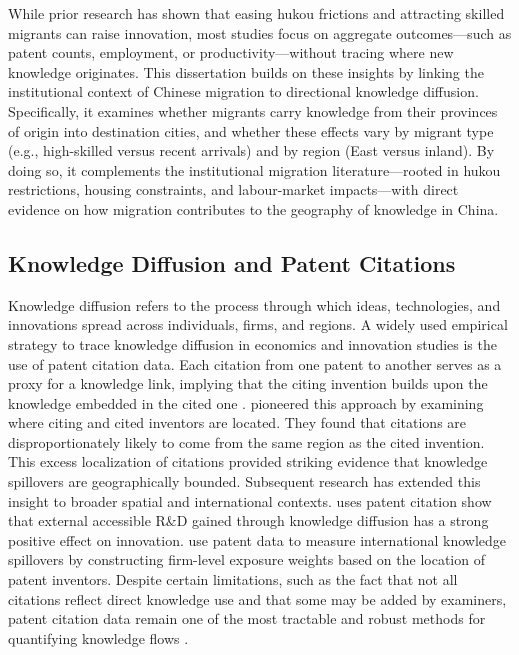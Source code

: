 \documentclass[12pt]{article}
\begin{document}
While prior research has shown that easing hukou frictions and attracting skilled migrants can raise innovation, most studies focus on aggregate outcomes---such as patent counts, employment, or productivity---without tracing where new knowledge originates. This dissertation builds on these insights by linking the institutional context of Chinese migration to directional knowledge diffusion. Specifically, it examines whether migrants carry knowledge from their provinces of origin into destination cities, and whether these effects vary by migrant type (e.g., high-skilled versus recent arrivals) and by region (East versus inland). By doing so, it complements the institutional migration literature---rooted in hukou restrictions, housing constraints, and labour-market impacts---with direct evidence on how migration contributes to the geography of knowledge in China.

\subsection{Knowledge Diffusion and Patent Citations} \label{sec:knowledge_diffusion}
Knowledge diffusion refers to the process through which ideas, technologies, and innovations spread across individuals, firms, and regions. A widely used empirical strategy to trace knowledge diffusion in economics and innovation studies is the use of patent citation data. Each citation from one patent to another serves as a proxy for a knowledge link, implying that the citing invention builds upon the knowledge embedded in the cited one \citep{nagaokaPatentStatisticsInnovation2010}. \cite{jaffeGeographicLocalizationKnowledge1993} pioneered this approach by examining where citing and cited inventors are located. They found that citations are disproportionately likely to come from the same region as the cited invention. This excess localization of citations provided striking evidence that knowledge spillovers are geographically bounded.
Subsequent research has extended this insight to broader spatial and international contexts. \cite{periDeterminantsKnowledgeFlows2005a} uses patent citation show that external accessible R\&D gained through knowledge diffusion has a strong positive effect on innovation. \cite{griffithHowSpecialSpecial2006} use patent data to measure international knowledge spillovers by constructing firm-level exposure weights based on the location of patent inventors. Despite certain limitations, such as the fact that not all citations reflect direct knowledge use and that some may be added by examiners, patent citation data remain one of the most tractable and robust methods for quantifying knowledge flows \citep{alcacerPatentCitationsMeasure2006}. 
\end{document}
